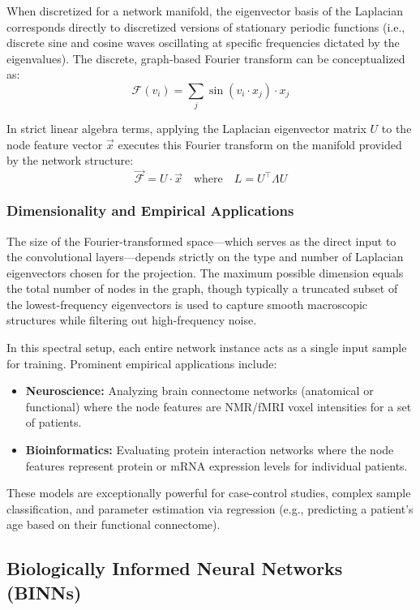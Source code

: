 When discretized for a network manifold, the eigenvector basis of the Laplacian corresponds directly to discretized versions of stationary periodic functions (i.e., discrete sine and cosine waves oscillating at specific frequencies dictated by the eigenvalues). The discrete, graph-based Fourier transform can be conceptualized as:
$$\mathcal{F}(v_i) = \sum_j \sin(v_i \cdot x_j) \cdot x_j$$

In strict linear algebra terms, applying the Laplacian eigenvector matrix $U$ to the node feature vector $\vec{x}$ executes this Fourier transform on the manifold provided by the network structure:
$$\vec{\mathcal{F}} = U \cdot \vec{x} \quad \text{where} \quad L = U^\top \Lambda U$$

\subsubsection{Dimensionality and Empirical Applications}

The size of the Fourier-transformed space—which serves as the direct input to the convolutional layers—depends strictly on the type and number of Laplacian eigenvectors chosen for the projection. The maximum possible dimension equals the total number of nodes in the graph, though typically a truncated subset of the lowest-frequency eigenvectors is used to capture smooth macroscopic structures while filtering out high-frequency noise.

In this spectral setup, each entire network instance acts as a single input sample for training. Prominent empirical applications include:
\begin{itemize}
    \item \textbf{Neuroscience:} Analyzing brain connectome networks (anatomical or functional) where the node features are NMR/fMRI voxel intensities for a set of patients.
    \item \textbf{Bioinformatics:} Evaluating protein interaction networks where the node features represent protein or mRNA expression levels for individual patients.
\end{itemize}
These models are exceptionally powerful for case-control studies, complex sample classification, and parameter estimation via regression (e.g., predicting a patient's age based on their functional connectome).

\subsection{Biologically Informed Neural Networks (BINNs)}
\label{subsec:binns}


